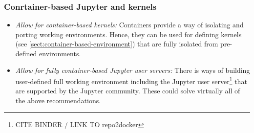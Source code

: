 \subsubsection{Conrtainer-based Jupyter and kernels}

\begin{itemize}
  \item \emph{Allow for container-based kernels:} Containers provide a way of isolating and porting working environments.
  Hence, they can be used for defining kernels (see \ref{sect:container-based-environment}) that are fully isolated from pre-defined environments.
  \item \emph{Allow for fully container-based Jupyter user servers:} There is ways of building user-defined full working environment including the Jupyter user server\footnote{CITE BINDER / LINK TO repo2docker} that are supported by the Jupyter community.
  These could solve virtually all of the above recommendations.
\end{itemize}
